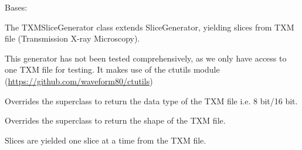 \documentclass[letterpaper,10pt,english]{sphinxmanual}
\begin{document}

\begin{fulllineitems}
\label{SliceGenerator:SliceGenerator.TXMSliceGenerator}
Bases: {\hyperref[SliceGenerator:SliceGenerator.SliceGenerator]{}}

The TXMSliceGenerator class extends SliceGenerator, yielding slices from TXM file (Transmission X-ray Microscopy).

This generator has not been tested comprehensively, as we only have access to one TXM file for testing. It makes use
of the ctutils module (\href{https://github.com/waveform80/ctutils}{https://github.com/waveform80/ctutils})

\begin{fulllineitems}
\label{SliceGenerator:SliceGenerator.TXMSliceGenerator.dtype}
Overrides the superclass to return the data type of the TXM file i.e. 8 bit/16 bit.

\end{fulllineitems}


\begin{fulllineitems}
\label{SliceGenerator:SliceGenerator.TXMSliceGenerator.shape}
Overrides the superclass to return the shape of the TXM file.

\end{fulllineitems}


\begin{fulllineitems}
\label{SliceGenerator:SliceGenerator.TXMSliceGenerator.slices}
Slices are yielded one slice at a time from the TXM file.

\end{fulllineitems}


\end{fulllineitems}

\end{document}
